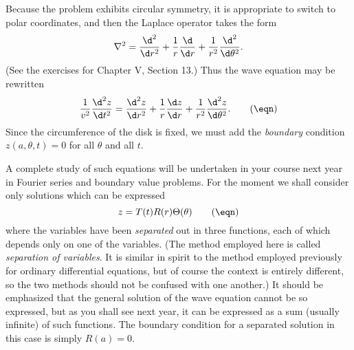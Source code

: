 Because the problem exhibits circular symmetry, it is appropriate
to switch to polar coordinates, and then the Laplace operator takes
the form
$$
\nabla^2 = \frac{\d^2}{\d r^2} + \frac 1r\frac{\d }{\d r} + \frac 1{r^2}
\frac{\d^2 }{\d\theta^2}.
$$
(See the exercises for Chapter V, Section 13.)
Thus the wave equation may be rewritten
\nexteqn
\xdef\Eqn{\eqn}
$$
\frac 1{v^2}\frac{\d^2 z}{\d t^2} 
 = \frac{\d^2z}{\d r^2} + \frac 1r\frac{\d z}{\d r} + \frac 1{r^2}
\frac{\d^2 z}{\d\theta^2}.\tag\eqn
$$
Since the circumference of the disk is fixed, we must add the
{\it boundary\/} condition  $z(a, \theta, t) = 0$ for all $\theta$ and
all $t$.

A complete study of such equations will be undertaken in your course
next year
in Fourier series and boundary value problems.   For the moment
we shall consider only solutions which
can be expressed
\nexteqn
\xdef\Sep{\eqn}
$$
z = T(t) R(r) \Theta(\theta)\tag\eqn
$$
where the variables have been {\it separated\/} out in three functions,
each of which
depends only on one of the variables.   (The method employed here is
called {\it separation of variables\/}.   It is  similar in spirit to
%
the method employed previously for ordinary differential equations,
but of course the context is entirely different, so the two methods should
not be confused with one another.)  It should be emphasized that
the general solution of the wave equation
cannot be so expressed, but as you shall see next year, it can
be expressed as a sum (usually infinite) of such functions.
The boundary condition for a separated solution in this case is
simply  $R(a) = 0$.

